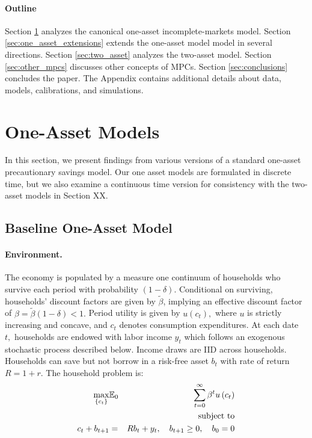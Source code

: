 

\paragraph{Outline}
Section \ref{sec:one_asset} analyzes the canonical one-asset incomplete-markets model. Section \ref{sec:one_asset_extensions} extends the one-asset model model in several directions. Section \ref{sec:two_asset} analyzes the two-asset model. Section \ref{sec:other_mpcs} discusses other concepts of MPCs. Section \ref{sec:conclusions} concludes the paper. The Appendix contains additional details about data, models, calibrations, and simulations.

\section{One-Asset Models}\label{sec:one_asset}
In this section, we present findings from various versions of a standard one-asset precautionary savings model. Our one asset models are formulated in discrete time, but we also examine a continuous time version for consistency with the two-asset models in Section XX.


\subsection{Baseline One-Asset Model}\label{subsec:baseline_one_asset}

\paragraph{Environment.} \label{sec:one_asset_discrete}
The economy is populated by a measure one continuum of households who survive each period with probability $\left( 1-\delta \right) $. Conditional on surviving, households' discount factors are given by $\tilde{\beta} $,  implying an effective discount factor of $\beta=\tilde{\beta}\left( 1-\delta \right) <1.$ Period utility is given by $u\left( c_{t}\right) ,$ where $u$ is strictly increasing and concave, and $c_{t}$ denotes consumption expenditures. At each date $t,$ households are endowed with labor income $y_{t}$ which follows an exogenous stochastic process described below. Income draws are IID across households. Households can save but not borrow in a risk-free asset $b_{t}$ with rate of return $R=1+r$. The household problem is:
\begin{eqnarray}
\max_{\left\{ c_{t}\right\} } &\mathbb{E}_{0}&\sum_{t=0}^{\infty
}\beta ^{t}u\left( c_{t}\right) 
\label{eq:HP_discrete} \\
&& \text{subject to} \notag \\
c_{t}+b_{t+1} &=& Rb_{t} + y_{t}, \quad b_{t+1} \geq 0, \quad b_0=0 \notag
\end{eqnarray}

